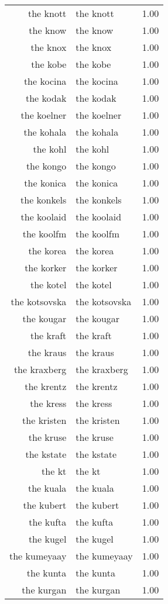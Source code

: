 \begin{table}[ht]
\begin{tabular}{rlr}
  the knott & the knott & 1.00 \\ 
  the know & the know & 1.00 \\ 
  the knox & the knox & 1.00 \\ 
  the kobe & the kobe & 1.00 \\ 
  the kocina & the kocina & 1.00 \\ 
  the kodak & the kodak & 1.00 \\ 
  the koelner & the koelner & 1.00 \\ 
  the kohala & the kohala & 1.00 \\ 
  the kohl & the kohl & 1.00 \\ 
  the kongo & the kongo & 1.00 \\ 
  the konica & the konica & 1.00 \\ 
  the konkels & the konkels & 1.00 \\ 
  the koolaid & the koolaid & 1.00 \\ 
  the koolfm & the koolfm & 1.00 \\ 
  the korea & the korea & 1.00 \\ 
  the korker & the korker & 1.00 \\ 
  the kotel & the kotel & 1.00 \\ 
  the kotsovska & the kotsovska & 1.00 \\ 
  the kougar & the kougar & 1.00 \\ 
  the kraft & the kraft & 1.00 \\ 
  the kraus & the kraus & 1.00 \\ 
  the kraxberg & the kraxberg & 1.00 \\ 
  the krentz & the krentz & 1.00 \\ 
  the kress & the kress & 1.00 \\ 
  the kristen & the kristen & 1.00 \\ 
  the kruse & the kruse & 1.00 \\ 
  the kstate & the kstate & 1.00 \\ 
  the kt & the kt & 1.00 \\ 
  the kuala & the kuala & 1.00 \\ 
  the kubert & the kubert & 1.00 \\ 
  the kufta & the kufta & 1.00 \\ 
  the kugel & the kugel & 1.00 \\ 
  the kumeyaay & the kumeyaay & 1.00 \\ 
  the kunta & the kunta & 1.00 \\ 
  the kurgan & the kurgan & 1.00 \\ 

\end{tabular}
\end{table}

